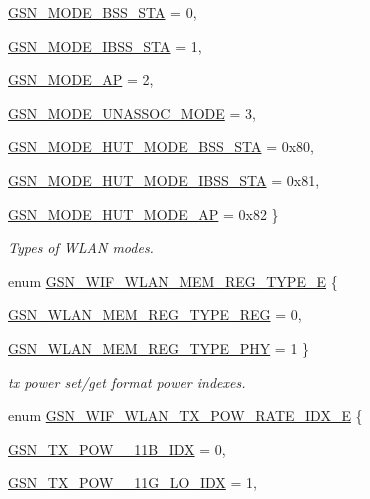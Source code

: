 \begin{DoxyCompactItemize}
\hyperlink{a00640_gga8d2c2dc6c9f7927c5cf4634d7b403b95a7b846af0882a2e9fdd177f290b02a6a1}{GSN\_\-MODE\_\-BSS\_\-STA} =  0, 
\par
\hyperlink{a00640_gga8d2c2dc6c9f7927c5cf4634d7b403b95ada8c3c5dcc25a633515f39d0622ed38a}{GSN\_\-MODE\_\-IBSS\_\-STA} =  1, 
\par
\hyperlink{a00640_gga8d2c2dc6c9f7927c5cf4634d7b403b95a67277979d811dae8f619f13ae651e957}{GSN\_\-MODE\_\-AP} =  2, 
\par
\hyperlink{a00640_gga8d2c2dc6c9f7927c5cf4634d7b403b95a2b9ddf1d3ec73ebec39439826d471cce}{GSN\_\-MODE\_\-UNASSOC\_\-MODE} =  3, 
\par
\hyperlink{a00640_gga8d2c2dc6c9f7927c5cf4634d7b403b95a2dfea59dcf8f2cc5cf5563dd98062949}{GSN\_\-MODE\_\-HUT\_\-MODE\_\-BSS\_\-STA} =  0x80, 
\par
\hyperlink{a00640_gga8d2c2dc6c9f7927c5cf4634d7b403b95a5c1af84ee44deddd78424d6649351d5c}{GSN\_\-MODE\_\-HUT\_\-MODE\_\-IBSS\_\-STA} =  0x81, 
\par
\hyperlink{a00640_gga8d2c2dc6c9f7927c5cf4634d7b403b95ad385a9345a8b96725314fefa76e307ad}{GSN\_\-MODE\_\-HUT\_\-MODE\_\-AP} =  0x82
 \}
\begin{DoxyCompactList}\small\item\em Types of WLAN modes. \end{DoxyCompactList}\item 
enum \hyperlink{a00677_ga7f657dfcb65c6810c23ae68bbca0b101}{GSN\_\-WIF\_\-WLAN\_\-MEM\_\-REG\_\-TYPE\_\-E} \{ \par
\hyperlink{a00640_gga7f657dfcb65c6810c23ae68bbca0b101aba4ce9371ded92ab818bd48b24d1b74f}{GSN\_\-WLAN\_\-MEM\_\-REG\_\-TYPE\_\-REG} =  0, 
\par
\hyperlink{a00640_gga7f657dfcb65c6810c23ae68bbca0b101afd4788d7537c66f77185272b27a0479e}{GSN\_\-WLAN\_\-MEM\_\-REG\_\-TYPE\_\-PHY} =  1
 \}
\begin{DoxyCompactList}\small\item\em tx power set/get format power indexes. \end{DoxyCompactList}\item 
enum \hyperlink{a00677_ga75fc31972dc5127c4ee4b3e585ab0206}{GSN\_\-WIF\_\-WLAN\_\-TX\_\-POW\_\-RATE\_\-IDX\_\-E} \{ \par
\hyperlink{a00640_gga75fc31972dc5127c4ee4b3e585ab0206aa8ef942d0ca232cab8243a718383af18}{GSN\_\-TX\_\-POW\_\_\-11B\_\-IDX} =  0, 
\par
\hyperlink{a00640_gga75fc31972dc5127c4ee4b3e585ab0206ae3826b232cc1ee4a30d46890b0718bb0}{GSN\_\-TX\_\-POW\_\_\-11G\_\-LO\_\-IDX} =  1, 

\end{DoxyCompactItemize}
